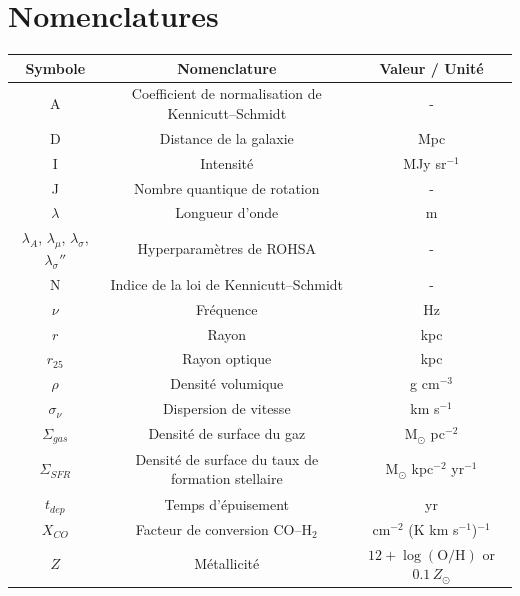 \section*{{Nomenclatures}}
\begingroup
\renewcommand{\arraystretch}{1.1}
\begin{table}[H]
	\centering
	\begin{tabular}{|c|c|c|}
		\hline
			Symbole & Nomenclature &Valeur / Unité\\
		\hline
			A & Coefficient de normalisation de Kennicutt--Schmidt & - \\
			D & Distance de la galaxie & Mpc \\
			I & Intensité & MJy sr$^{-1}$ \\
			J & Nombre quantique de rotation & - \\
			$\lambda$ & Longueur d'onde & m \\
			$\lambda_A$, $\lambda_\mu$, $\lambda_\sigma$, $\lambda_\sigma''$ & Hyperparamètres de ROHSA & - \\
			N & Indice de la loi de Kennicutt--Schmidt & - \\
			$\nu$ & Fréquence & Hz \\
			$r$ & Rayon & kpc \\
			$r_{25}$ & Rayon optique & kpc \\
			$\rho$ & Densité volumique & g cm$^{-3}$ \\
			$\sigma_\nu$ & Dispersion de vitesse & km s$^{-1}$ \\
			$\Sigma_{  gas}$ & Densité de surface du gaz & M$_\odot$ pc$^{-2}$ \\
			$\Sigma_{  SFR}$ & Densité de surface du taux de formation stellaire & M$_\odot$ kpc$^{-2}$ yr$^{-1}$ \\
			$t_{dep}$ & Temps d'épuisement & yr \\
			$X_{  CO}$ & Facteur de conversion CO--H$_2$ & cm$^{-2}$ (K km s$^{-1}$)$^{-1}$ \\
			$Z$ & Métallicité & $12 + \log(\mathrm{O/H})$ or $0.1\,Z_\odot$ \\
		\hline
	\end{tabular}
\end{table}
\endgroup